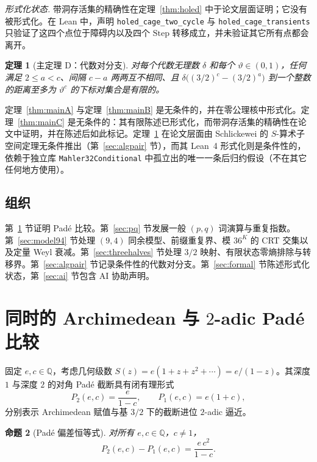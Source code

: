 \documentclass[11pt,a4paper]{article}
\newtheorem{theorem}{定理}[section]
\newtheorem{proposition}[theorem]{命题}
\theoremstyle{remark}
\newcommand{\Q}{\mathbb{Q}}
\begin{document}
\noindent\emph{形式化状态.} 带洞存活集的精确性在定理~\ref{thm:holed} 中于论文层面证明；它没有被形式化。在 Lean 中，声明 \texttt{holed\_cage\_two\_cycle} 与 \texttt{holed\_cage\_transients} 只验证了这四个点位于障碍内以及四个 $\mathrm{Step}$ 转移成立，并未验证其它所有点都会离开。

\begin{theorem}[主定理 D：代数对分支]
\label{thm:mainD}
对每个代数无理数 $\delta$ 和每个 $\vartheta \in (0,1)$，任何满足 $2 \le a < c$、间隔 $c-a$ 两两互不相同、且 $\delta\bigl((3/2)^{c} - (3/2)^{a}\bigr)$ 到一个整数的距离至多为 $\vartheta^{c}$ 的下标对集合是有限的。
\end{theorem}

定理~\ref{thm:mainA} 与定理~\ref{thm:mainB} 是无条件的，并在零公理核中形式化。定理~\ref{thm:mainC} 是无条件的：其有限陈述已形式化，而带洞存活集的精确性在论文中证明，并在陈述后如此标记。定理~\ref{thm:mainD} 在论文层面由 Schlickewei 的 $S$-算术子空间定理无条件推出（第~\ref{sec:algpair} 节），而其 Lean~4 形式化则是条件性的，依赖于独立库 \texttt{Mahler32Conditional} 中孤立出的唯一一条后归约假设（不在其它任何地方使用）。

\subsection{组织}

第~\ref{sec:pade} 节证明 Pad\'e 比较。第~\ref{sec:pq} 节发展一般 $(p,q)$ 词演算与重复指数。第~\ref{sec:model94} 节处理 $(9,4)$ 同余模型、前缀重复界、模 $36^{K}$ 的 CRT 交集以及定量 Weyl 衰减。第~\ref{sec:threehalves} 节处理 $3/2$ 映射、有限状态零熵排除与转移界。第~\ref{sec:algpair} 节记录条件性的代数对分支。第~\ref{sec:formal} 节陈述形式化状态，第~\ref{sec:ai} 节包含 AI 协助声明。

\section{同时的 Archimedean 与 \texorpdfstring{$2$}{2}-adic Pad\'e 比较}
\label{sec:pade}

固定 $e, c \in \Q$，考虑几何级数 $S(z) = e(1 + z + z^{2} + \cdots) = e/(1-z)$。其深度 $1$ 与深度 $2$ 的对角 Pad\'e 截断具有闭有理形式
\begin{equation}
  P_{2}(e,c) = \frac{e}{1-c}, \qquad P_{1}(e,c) = e(1+c),
\end{equation}
分别表示 Archimedean 赋值与基 $3/2$ 下的截断进位 $2$-adic 逼近。

\begin{proposition}[Pad\'e 偏差恒等式]
\label{prop:identity}
对所有 $e, c \in \Q$，$c \neq 1$，
\begin{equation}
  P_{2}(e,c) - P_{1}(e,c) = \frac{e\,c^{2}}{1-c}.
\end{equation}
\end{proposition}
\end{document}
